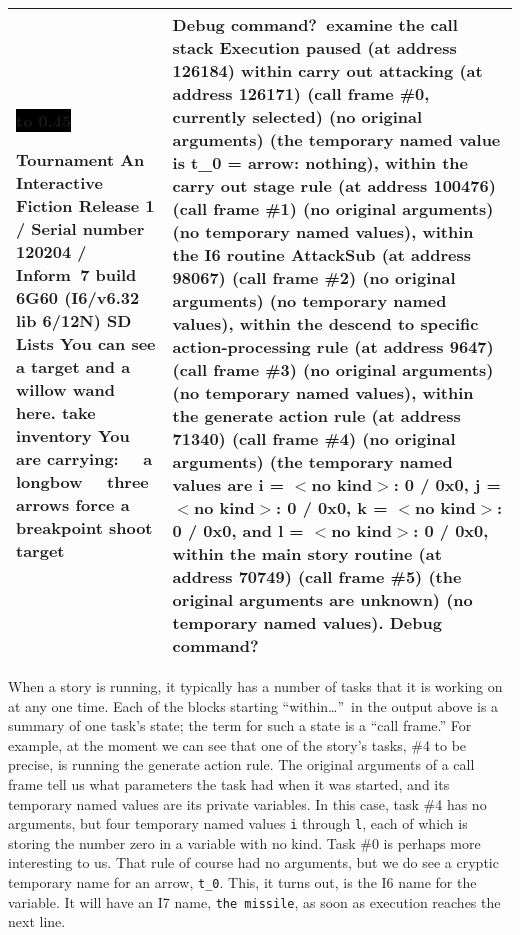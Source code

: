 \documentclass{book}
\newcommand{\n}{\hspace*{\fill}\newline}
\newcommand{\terp}[2]{\begin{center}\begin{tabular}{p{0.45\textwidth}|p{0.45\textwidth}}\midrule #1&#2\\\midrule\end{tabular}\end{center}}
\newcommand{\glkheading}[1]{\textbf{#1}}
\newcommand{\glkinput}[1]{\textbf{#1}}
\newcommand{\glkstatusline}[2]{\centerline{\colorbox{black}{\hbox to 0.45\textwidth{\textcolor{white}{#1\hfil #2}}}}}
\newcommand{\storyprompt}{\raisebox{1.5pt}{\(>\)}}
\newcommand{\cursor}{\raisebox{-1.5pt}{\RectangleThin}}
\begin{document}
\terp{\glkstatusline{Lists}{0/2}\n
  \glkheading{Tournament}\n
  An Interactive Fiction\n
  Release 1 / Serial number 120204 / Inform~7 build 6G60 (I6/v6.32 lib 6/12N) SD\n
  \n
  \glkheading{Lists}\n
  You can see a target and a willow wand here.\n
  \n
  \storyprompt\glkinput{take inventory}\n
  You are carrying:\n
  \null\ \ a longbow\n
  \null\ \ three arrows\n
  \n
  \storyprompt\glkinput{force a breakpoint}\n
  \storyprompt\glkinput{shoot target}}{%
  Debug command?\ \glkinput{examine the call stack}\n
  \n
  Execution paused (at address 126184)\n
  within carry out attacking (at address 126171) (call frame \#0, currently selected)\n
  \null\qquad (no original arguments)\n
  \null\qquad (the temporary named value is\n
  \null\qquad \qquad t\_0 = arrow: nothing),\n
  within the carry out stage rule (at address 100476) (call frame \#1)\n
  \null\qquad (no original arguments)\n
  \null\qquad (no temporary named values),\n
  within the I6 routine AttackSub (at address 98067) (call frame \#2)\n
  \null\qquad (no original arguments)\n
  \null\qquad (no temporary named values),\n
  within the descend to specific action-processing rule (at address 9647) (call frame \#3)\n
  \null\qquad (no original arguments)\n
  \null\qquad (no temporary named values),\n
  within the generate action rule (at address 71340) (call frame \#4)\n
  \null\qquad (no original arguments)\n
  \null\qquad (the temporary named values are\n
  \null\qquad \qquad i = \(<\)no kind\(>\): 0 / 0x0,\n
  \null\qquad \qquad j = \(<\)no kind\(>\): 0 / 0x0,\n
  \null\qquad \qquad k = \(<\)no kind\(>\): 0 / 0x0, and\n
  \null\qquad \qquad l = \(<\)no kind\(>\): 0 / 0x0,\n
  within the main story routine (at address 70749) (call frame \#5)\n
  \null\qquad (the original arguments are unknown)\n
  \null\qquad (no temporary named values).\n
  \n
  Debug command?\ \cursor}

When a story is running, it typically has a number of tasks that it is working
on at any one time.  Each of the blocks starting ``within\dots''\ in the output
above is a summary of one task's state; the term for such a state is a ``call
frame.''  For example, at the moment we can see that one of the story's tasks,
\#4 to be precise, is running the generate action rule.  The original arguments
of a call frame tell us what parameters the task had when it was started, and
its temporary named values are its private variables.  In this case, task \#4
has no arguments, but four temporary named values \lstinline{i} through
\lstinline{l}, each of which is storing the number zero in a variable with no
kind.  Task \#0 is perhaps more interesting to us.  That rule of course had no
arguments, but we do see a cryptic temporary name for an arrow, \lstinline{t_0}.
This, it turns out, is the I6 name for the variable.  It will have an I7 name,
\lstinline{the missile}, as soon as execution reaches the next line.
\end{document}

